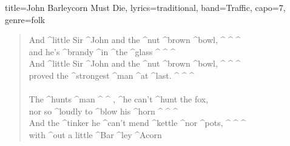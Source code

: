 \documentclass{article}
\def\RemoveSpaces#1{%
  \begingroup
  \spaceskip1sp
  \xspaceskip1sp
  #1%
  \endgroup}
\begin{document}
\begin{song}{title={John Barleycorn Must Die}, lyrics={traditional}, band={Traffic}, capo={7}, genre={folk}}
\begin{verse}
	\end{verse}
	\begin{chorus*}
		       
	\end{chorus*}
	\begin{verse}
		And ^little Sir ^John and the ^nut ^brown ^bowl, ^ {} ^ {} ^ {} \\
		and he's ^brandy ^in ^the ^glass ^ {} ^ {} ^ {} \\
		And ^little Sir ^John and the ^nut ^brown ^bowl, ^ {} ^ {} ^ {} \\
		proved the ^strongest ^man ^at ^last. ^ {} ^ {} ^ {} \\
		\\
		The \RemoveSpaces{^hunts ^man }^ {} ^ {}
		, ^he can't ^hunt the fox, \\
		nor so ^loudly to ^blow his ^horn ^ {} ^ {} ^ {} \\
		And the ^tinker he ^can't mend ^kettle ^nor ^pots, ^ {} ^ {} ^ {} \\
		with ^out a little \RemoveSpaces{^Bar ^ley ^{A}corn } \\
	\end{verse}
\end{song}
\end{document}
